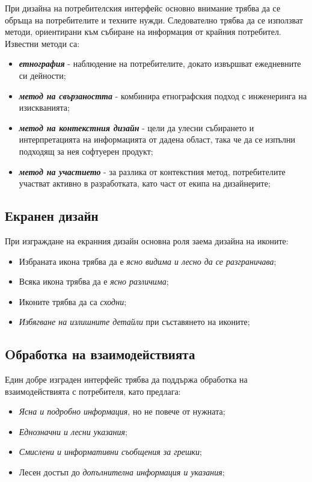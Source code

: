 \documentclass[fleqn,12pt]{article}
\begin{document}
При дизайна на потребителския интерфейс основно внимание трябва да се обръща на потребителите и техните нужди.
Следователно трябва да се използват методи, ориентирани към събиране на информация от крайния потребител.
\bigbreak
Известни методи са:
\begin{itemize}
    \item \textbf{\textit{етнография}} - наблюдение на потребителите, докато извършват ежедневните си дейности;
    \item \textbf{\textit{метод на свързаността}} - комбинира етнографския подход с инженеринга на изискванията;
    \item \textbf{\textit{метод на контекстния дизайн}} - цели да улесни събирането и интерпретацията на информацията от дадена област, така че да се изпълни подходящ за нея софтуерен продукт;
    \item \textbf{\textit{метод на участието}} - за разлика от контекстния метод, потребителите участват активно в разработката, като част от екипа на дизайнерите;
\end{itemize}

\subsection{Екранен  дизайн}

При изграждане на екранния дизайн основна роля заема дизайна на иконите:
\begin{itemize}
    \item Избраната икона трябва да е \textit{ясно видима и лесно да се разграничава};
    \item Всяка икона трябва да е \textit{ясно различима};
    \item Иконите трябва да са \textit{сходни};
    \item \textit{Избягване на излишните детайли} при съставянето на иконите;
\end{itemize}

\subsection{Oбработка на взаимодействията}

Един добре изграден интерфейс трябва да поддържа обработка на взаимодействията с потребителя, като предлага:
\begin{itemize}
    \item \textit{Ясна и подробно информация}, но не повече от нужната;
    \item \textit{Еднозначни и лесни указания};
    \item \textit{Смислени и информативни съобщения за грешки};
    \item Лесен достъп до \textit{допълнителна информация и указания};
\end{itemize}
\end{document}
